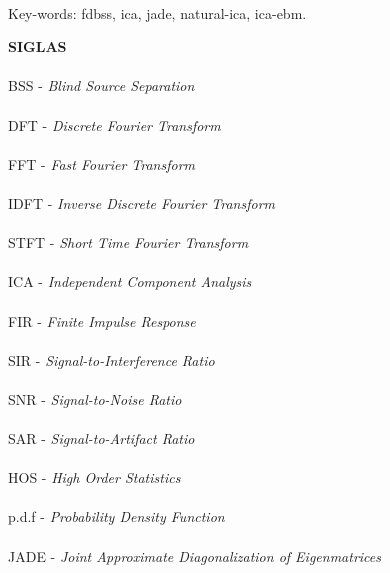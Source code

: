 \paragraph{}
\noindent Key-words: fdbss, ica, jade, natural-ica, ica-ebm.

\pagebreak


\begin{center}
\textbf{SIGLAS}
\end{center}
      \vspace{0.5cm}

\paragraph{}BSS  - \textit{Blind Source Separation}
\paragraph{}DFT  - \textit{Discrete Fourier Transform}
\paragraph{}FFT  - \textit{Fast Fourier Transform}
\paragraph{}IDFT  - \textit{Inverse Discrete Fourier Transform}
\paragraph{}STFT - \textit{Short Time Fourier Transform}
\paragraph{}ICA  - \textit{Independent Component Analysis}
\paragraph{}FIR  - \textit{Finite Impulse Response}
\paragraph{}SIR  - \textit{Signal-to-Interference Ratio}
\paragraph{}SNR  - \textit{Signal-to-Noise Ratio}
\paragraph{}SAR  - \textit{Signal-to-Artifact Ratio}
\paragraph{}HOS  - \textit{High Order Statistics}
\paragraph{}p.d.f  - \textit{Probability Density Function}
\paragraph{}JADE  - \textit{Joint Approximate Diagonalization of Eigenmatrices}
\pagebreak







